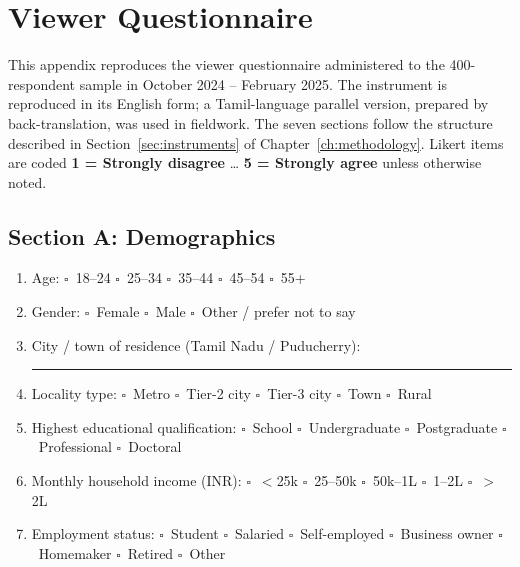 \chapter{Viewer Questionnaire}
\label{app:viewer_q}

\noindent
This appendix reproduces the viewer questionnaire administered to
the 400-respondent sample in October 2024 -- February 2025.  The
instrument is reproduced in its English form; a Tamil-language
parallel version, prepared by back-translation, was used in
fieldwork.  The seven sections follow the structure described in
Section~\ref{sec:instruments} of Chapter~\ref{ch:methodology}.
Likert items are coded \textbf{1 = Strongly disagree} \dots
\textbf{5 = Strongly agree} unless otherwise noted.

\section*{Section A: Demographics}
\begin{enumerate}[itemsep=2pt]
  \item Age: \quad $\square$~18--24 \quad $\square$~25--34 \quad
        $\square$~35--44 \quad $\square$~45--54 \quad $\square$~55+
  \item Gender: \quad $\square$~Female \quad $\square$~Male \quad
        $\square$~Other / prefer not to say
  \item City / town of residence (Tamil Nadu / Puducherry):
        \rule{6cm}{0.4pt}
  \item Locality type: \quad $\square$~Metro \quad $\square$~Tier-2 city
        \quad $\square$~Tier-3 city \quad $\square$~Town \quad
        $\square$~Rural
  \item Highest educational qualification: \quad $\square$~School
        \quad $\square$~Undergraduate \quad $\square$~Postgraduate
        \quad $\square$~Professional \quad $\square$~Doctoral
  \item Monthly household income (INR): \quad $\square$~$<$25k
        \quad $\square$~25--50k \quad $\square$~50k--1L \quad
        $\square$~1--2L \quad $\square$~$>$2L
  \item Employment status: \quad $\square$~Student \quad
        $\square$~Salaried \quad $\square$~Self-employed \quad
        $\square$~Business owner \quad $\square$~Homemaker \quad
        $\square$~Retired \quad $\square$~Other
\end{enumerate}

